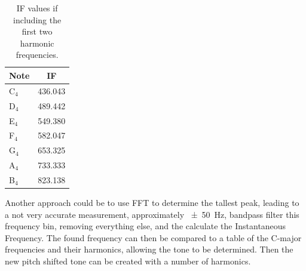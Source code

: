 \begin{table}
	\centering
	\begin{tabular}{l c}
		\toprule
		Note & IF \\
		\midrule
		C$_4$ & \num{436.043} \\
		D$_4$ & \num{489.442} \\
		E$_4$ & \num{549.380} \\
		F$_4$ & \num{582.047} \\
		G$_4$ & \num{653.325} \\
		A$_4$ & \num{733.333} \\
		B$_4$ & \num{823.138} \\
		\bottomrule
	\end{tabular}
	\caption{IF values if including the first two harmonic frequencies.}
	\label{tab:CmajorIF}
\end{table}

Another approach could be to use FFT to determine the tallest peak, leading to a not very accurate measurement, approximately \SI{\pm50}{\hertz}, bandpass filter this frequency bin, removing everything else, and the calculate the Instantaneous Frequency.
The found frequency can then be compared to a table of the C-major frequencies and their harmonics, allowing the tone to be determined.
Then the new pitch shifted tone can be created with a number of harmonics.